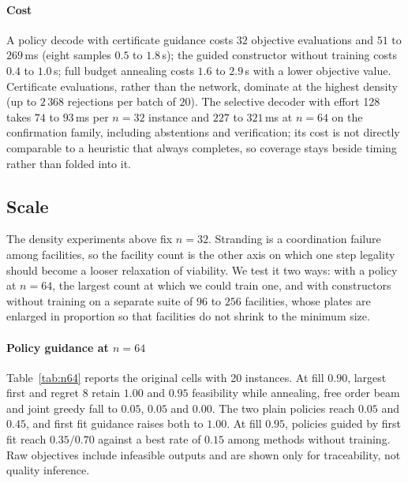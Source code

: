 \documentclass[preprint,12pt,authoryear]{elsarticle}
\begin{document}
\paragraph{Cost}
A policy decode with certificate guidance costs $32$ objective evaluations and $51$
to $269$\,ms (eight samples $0.5$ to $1.8$\,s); the guided constructor without
training costs $0.4$ to $1.0$\,s; full budget annealing costs $1.6$ to $2.9$\,s with a
lower objective value. Certificate evaluations, rather than the network, dominate at the
highest density (up to $2\,368$ rejections per batch of $20$). The selective
decoder with effort 128 takes $74$ to $93$\,ms per $n=32$ instance and $227$ to
$321$\,ms at $n=64$ on the confirmation family, including abstentions and
verification; its cost is not directly comparable to a heuristic that always
completes, so coverage stays beside timing rather than folded into it.

\subsection{Scale}
\label{sec:results_scale}

The density experiments above fix $n=32$. Stranding is a coordination failure
among facilities, so the facility count is the other axis on which one step
legality should become a looser relaxation of viability. We test it two ways:
with a policy at $n=64$, the largest count at which we could train one, and with
constructors without training on a separate suite of $96$ to $256$ facilities, whose
plates are enlarged in proportion so that facilities do not shrink to the
minimum size.

\paragraph{Policy guidance at $n=64$}
Table~\ref{tab:n64} reports the original cells with 20 instances. At fill $0.90$,
largest first and regret $8$ retain $1.00$ and $0.95$ feasibility while annealing,
free order beam and joint greedy fall to $0.05$, $0.05$ and $0.00$. The two plain
policies reach $0.05$ and $0.45$, and first fit guidance raises both to $1.00$. At
fill $0.95$, policies guided by first fit reach $0.35/0.70$ against a best
rate of $0.15$ among methods without training. Raw objectives include infeasible outputs and are
shown only for traceability, not quality inference.
\end{document}
